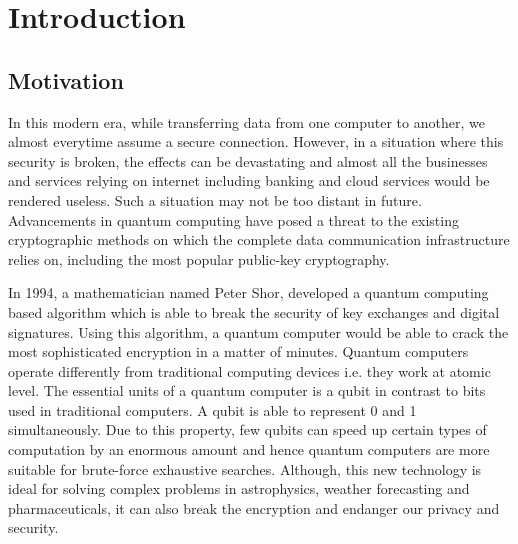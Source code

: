 \chapter{Introduction}
\label{chap:intro}
\setlength{\parskip}{1.5mm}
\section{Motivation}

In this modern era, while transferring data from one computer to another, we almost everytime assume a secure connection. However, in a situation where this security is broken, the effects can be devastating and almost all the businesses and services relying on internet including banking and cloud services would be rendered useless. Such a situation may not be too distant in future. Advancements in quantum computing have posed a threat to the existing cryptographic methods on which the complete data communication infrastructure relies on, including the most popular public-key cryptography.

In 1994, a mathematician named Peter Shor, developed a quantum computing based algorithm which is able to break the security of key exchanges and digital signatures. Using this algorithm, a quantum computer would be able to crack the most sophisticated encryption in a matter of minutes. Quantum computers operate differently from traditional computing devices i.e. they work at atomic level. The essential units of a quantum computer is a qubit in contrast to bits used in traditional computers. A qubit is able to represent 0 and 1 simultaneously. Due to this property, few qubits can speed up certain types of computation by an enormous amount and hence quantum computers are more suitable for brute-force exhaustive searches. Although, this new technology is ideal for solving complex problems in astrophysics, weather forecasting and pharmaceuticals, it can also break the encryption and endanger our privacy and security.\\\\\\

